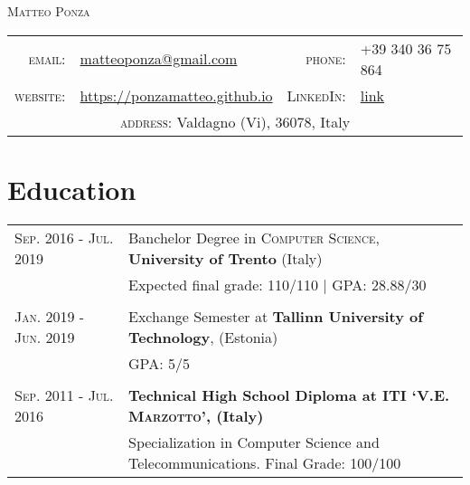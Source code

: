\documentclass[a4paper,10pt]{article}
\begin{document}
\pagestyle{empty} %
\par{\centering
		{\Huge \textsc{Matteo Ponza}
	}\bigskip\par}

\begin{center}
\begin{tabular}{rlrl}
  \textsc{email:}     & \href{mailto:matteoponza@gmail.com}{matteoponza@gmail.com} &
  \textsc{phone:}     & +39 340 36 75 864\\
  \textsc{website:}   & \href{https://ponzamatteo.github.io/}{https://ponzamatteo.github.io} & \textsc{LinkedIn:} & \href{https://www.linkedin.com/in/matteo-ponza-557136135}{link}\\
  \multicolumn{4}{c}{\textsc{address:} \quad Valdagno (Vi), 36078, Italy} \\
\end{tabular}
\end{center}

\section{Education}
\begin{tabular}{m{0.25\linewidth}|p{0.75\linewidth}}
  \textsc{Sep. 2016 - Jul. 2019} &
  Banchelor Degree in \textsc{Computer Science},
  \textbf{University of Trento} (Italy)\\
  & Expected final grade: 110/110 | \textsc{GPA}: 28.88/30\\
  \multicolumn{2}{c}{} \\

  \textsc{Jan. 2019 - Jun. 2019}& 
  Exchange Semester at \textbf{Tallinn University of Technology}, (Estonia)\\& GPA: 5/5 \\

  \multicolumn{2}{c}{} \\
  \textsc{Sep. 2011 - Jul. 2016} &
  \textbf{Technical High School Diploma at \textsc{ITI ‘V.E. Marzotto’}, (Italy)}
\\ & Specialization in Computer Science and Telecommunications. Final Grade: 100/100
\end{tabular}
\end{document}

